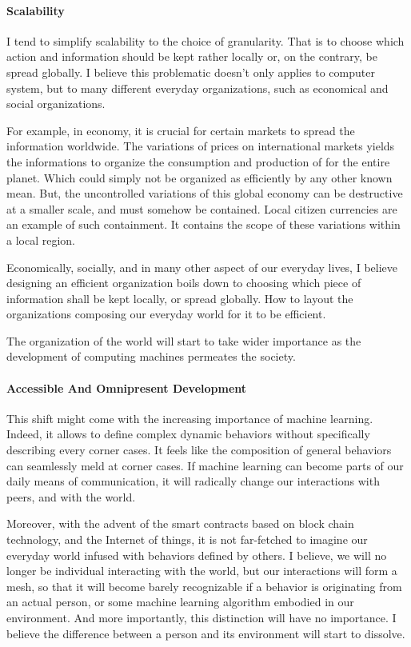 \paragraph{Scalability}

I tend to simplify scalability to the choice of granularity.
That is to choose which action and information should be kept rather locally or, on the contrary, be spread globally.
I believe this problematic doesn't only applies to computer system, but to many different everyday organizations, such as economical and social organizations.

For example, in economy, it is crucial for certain markets to spread the information worldwide.
The variations of prices on international markets yields the informations to organize the consumption and production of for the entire planet.
Which could simply not be organized as efficiently by any other known mean.
But, the uncontrolled variations of this global economy can be destructive at a smaller scale, and must somehow be contained.
Local citizen currencies are an example of such containment.
It contains the scope of these variations within a local region.

Economically, socially, and in many other aspect of our everyday lives, I believe designing an efficient organization boils down to choosing which piece of information shall be kept locally, or spread globally.
How to layout the organizations composing our everyday world for it to be efficient.

The organization of the world will start to take wider importance as the development of computing machines permeates the society.

\paragraph{Accessible And Omnipresent Development}

This shift might come with the increasing importance of machine learning.
Indeed, it allows to define complex dynamic behaviors without specifically describing every corner cases.
It feels like the composition of general behaviors can seamlessly meld at corner cases.
If machine learning can become parts of our daily means of communication, it will radically change our interactions with peers, and with the world. 

Moreover, with the advent of the smart contracts based on block chain technology, and the Internet of things, it is not far-fetched to imagine our everyday world infused with behaviors defined by others.
I believe, we will no longer be individual interacting with the world, but our interactions will form a mesh, so that it will become barely recognizable if a behavior is originating from an actual person, or some machine learning algorithm embodied in our environment.
And more importantly, this distinction will have no importance.
I believe the difference between a person and its environment will start to dissolve.